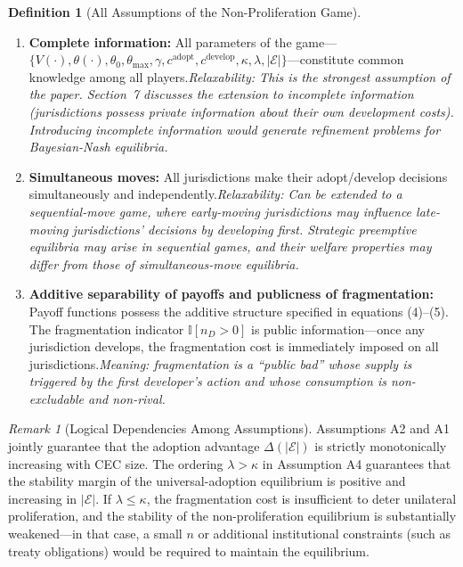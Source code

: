 \documentclass[12pt,a4paper]{article}
\theoremstyle{definition}
\newtheorem{definition}{Definition}[section]
\theoremstyle{remark}
\newtheorem{remark}{Remark}[section]
\begin{document}
\begin{definition}[All Assumptions of the Non-Proliferation Game]
\begin{enumerate}[label=\textbf{A\arabic*}, leftmargin=*, itemsep=4pt]
\item \textbf{Complete information:} All parameters of the game---$\{V(\cdot), \theta(\cdot), \theta_0, \theta_{\max}, \gamma, c^{\text{adopt}}, c^{\text{develop}}, \kappa, \lambda, |\mathcal{E}|\}$---constitute common knowledge among all players.\hfill\textit{Relaxability: This is the strongest assumption of the paper. Section~7 discusses the extension to incomplete information (jurisdictions possess private information about their own development costs). Introducing incomplete information would generate refinement problems for Bayesian-Nash equilibria.}

\item \textbf{Simultaneous moves:} All jurisdictions make their adopt/develop decisions simultaneously and independently.\hfill\textit{Relaxability: Can be extended to a sequential-move game, where early-moving jurisdictions may influence late-moving jurisdictions' decisions by developing first. Strategic preemptive equilibria may arise in sequential games, and their welfare properties may differ from those of simultaneous-move equilibria.}

\item \textbf{Additive separability of payoffs and publicness of fragmentation:} Payoff functions possess the additive structure specified in equations (4)--(5). The fragmentation indicator $\mathbb{I}[n_D > 0]$ is public information---once any jurisdiction develops, the fragmentation cost is immediately imposed on all jurisdictions.\hfill\textit{Meaning: fragmentation is a ``public bad'' whose supply is triggered by the first developer's action and whose consumption is non-excludable and non-rival.}
\end{enumerate}
\end{definition}

\begin{remark}[Logical Dependencies Among Assumptions]
Assumptions A2 and A1 jointly guarantee that the adoption advantage $\Delta(|\mathcal{E}|)$ is strictly monotonically increasing with CEC size. The ordering $\lambda > \kappa$ in Assumption A4 guarantees that the stability margin of the universal-adoption equilibrium is positive and increasing in $|\mathcal{E}|$. If $\lambda \leq \kappa$, the fragmentation cost is insufficient to deter unilateral proliferation, and the stability of the non-proliferation equilibrium is substantially weakened—in that case, a small $n$ or additional institutional constraints (such as treaty obligations) would be required to maintain the equilibrium.
\end{remark}
\end{document}

